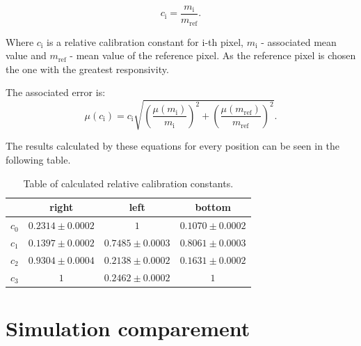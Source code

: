 \begin{equation}
c_{\textrm{i}} = \frac{m_{\textrm{i}}}{m_{\textrm{ref}}}.
\end{equation}

Where $c_{\textrm{i}}$ is a relative calibration constant for i-th pixel, $m_{\textrm{i}}$ - associated mean value and $m_{\textrm{ref}}$ - mean value of the reference pixel. As the reference pixel is chosen the one with the greatest responsivity. 
\par
The associated error is:
\begin{equation}
\mu(c_{\textrm{i}}) = c_{\textrm{i}} \sqrt{(\frac{\mu(m_{\textrm{i}})}{m_{\textrm{i}}})^2 + (\frac{\mu(m_{\textrm{ref}})}{m_{\textrm{ref}}})^2}.
\end{equation}

The results calculated by these equations for every position can be seen in the following table.

\begin{table}[H]
\centering
\begin{tabular}{|c|c|c|c|}
\hline
   & right & left & bottom \\ \hline
$c_0$ & $0.2314 \pm 0.0002$    & $1$   				   & $0.1070 \pm 0.0002$     \\ \hline
$c_1$ & $0.1397 \pm 0.0002$    & $0.7485 \pm 0.0003$   & $0.8061 \pm 0.0003$      \\ \hline
$c_2$ & $0.9304 \pm 0.0004$    & $0.2138 \pm 0.0002$   & $0.1631 \pm 0.0002$      \\ \hline
$c_3$ & $1$    				   & $0.2462 \pm 0.0002$   & $1$      \\ \hline
\end{tabular}
\caption{Table of calculated relative calibration constants.}
 \label{CalibConstTbl}
\end{table}



\section{Simulation comparement}



